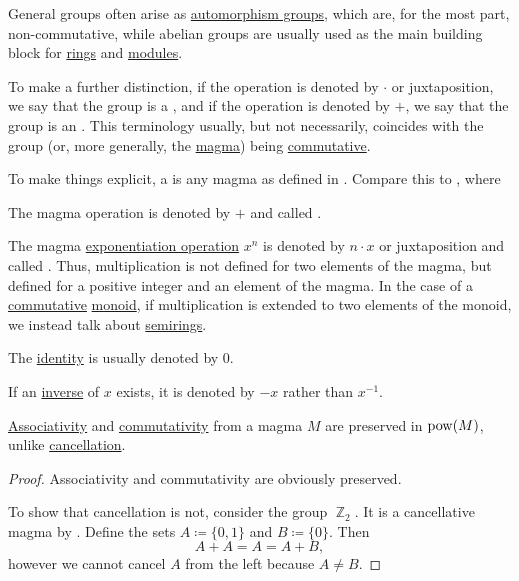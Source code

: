 \begin{remark}\label{rem:additive_magma}
  General groups often arise as \hyperref[def:automorphism_group]{automorphism groups}, which are, for the most part, non-commutative, while abelian groups are usually used as the main building block for \hyperref[def:semiring/ring]{rings} and \hyperref[def:left_module]{modules}.

  To make a further distinction, if the operation is denoted by \( \cdot \) or juxtaposition, we say that the group is a , and if the operation is denoted by \( + \), we say that the group is an . This terminology usually, but not necessarily, coincides with the group (or, more generally, the \hyperref[def:magma]{magma}) being \hyperref[def:magma/commutative]{commutative}.

  To make things explicit, a  is any magma as defined in . Compare this to , where
  \begin{thmenum}
     The magma operation is denoted by \( + \) and called .

     The magma \hyperref[def:magma/exponentiation]{exponentiation operation} \( x^n \) is denoted by \( n \cdot x \) or juxtaposition and called . Thus, multiplication is not defined for two elements of the magma, but defined for a positive integer and an element of the magma. In the case of a \hyperref[def:magma/commutative]{commutative} \hyperref[def:monoid]{monoid}, if multiplication is extended to two elements of the monoid, we instead talk about \hyperref[def:semiring]{semirings}.

     The \hyperref[def:magma_identity]{identity} is usually denoted by \( 0 \).

     If an \hyperref[def:monoid_inverse_element]{inverse} of \( x \) exists, it is denoted by \( -x \) rather than \( x^{-1} \).
  \end{thmenum}
\end{remark}

\begin{proposition}\label{thm:power_set_magma_preservation}
  \hyperref[def:magma/associative]{Associativity} and \hyperref[def:magma/commutative]{commutativity} from a magma \( M \) are preserved in \( \operatorname{pow}(M) \), unlike \hyperref[def:magma/cancellative]{cancellation}.
\end{proposition}
\begin{proof}
  Associativity and commutativity are obviously preserved.

  To show that cancellation is not, consider the group \hyperref[def:group_of_integers_modulo]{\( \BbbZ_2 \)}. It is a cancellative magma by . Define the sets \( A \coloneqq \{ 0, 1 \} \) and \( B \coloneqq \{ 0 \} \). Then
  \begin{equation*}
    A + A = A = A + B,
  \end{equation*}
  however we cannot cancel \( A \) from the left because \( A \neq B \).
\end{proof}

